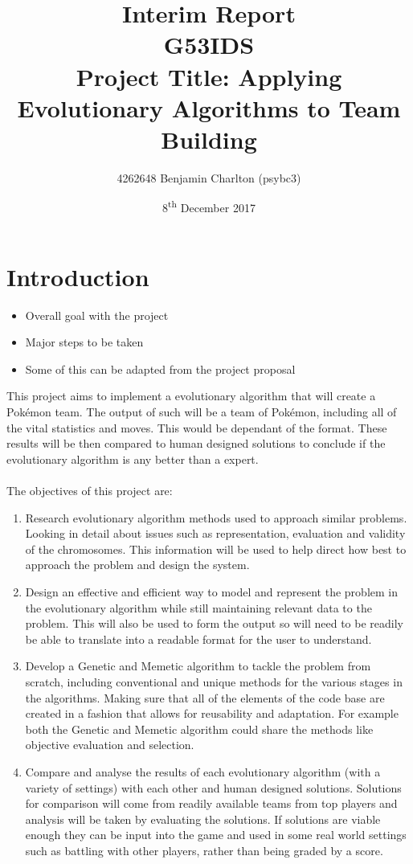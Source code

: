 \documentclass[a4paper]{article}
\title{
    Interim Report
    \\ \large{G53IDS}
    \\ \large{Project Title: Applying Evolutionary Algorithms to \Pokemon{} Team Building}\vspace{-3ex}}
\author{4262648 Benjamin Charlton (psybc3)}
\date{\vspace{-2ex}8\textsuperscript{th} December 2017}
\newcommand{\Pokemon}{Pok\'{e}mon}
\begin{document}
\maketitle
\pagebreak

\tableofcontents
{}
\pagebreak

\section{Introduction}
\begin{itemize}
    \item Overall goal with the project
    \item Major steps to be taken
    \item Some of this can be adapted from the project proposal
\end{itemize}

This project aims to implement a evolutionary algorithm that will create a \Pokemon{} team.
The output of such will be a team of \Pokemon{}, including all of the vital statistics and moves.
This would be dependant of the format. These results will be then compared to human designed solutions to conclude if the evolutionary algorithm is any better than a expert.\\
\\The objectives of this project are:
\begin{enumerate}
    \item Research evolutionary algorithm methods used to approach similar problems.
    Looking in detail about issues such as representation, evaluation and validity of the chromosomes.
    This information will be used to help direct how best to approach the problem and design the system.
    \item Design an effective and efficient way to model and represent the problem in the evolutionary algorithm while still maintaining relevant data to the problem.
    This will also be used to form the output so will need to be readily be able to translate into a readable format for the user to understand.
    \item Develop a Genetic and Memetic algorithm to tackle the problem from scratch, including conventional and unique methods for the various stages in the algorithms.
    Making sure that all of the elements of the code base are created in a fashion that allows for reusability and adaptation.
    For example both the Genetic and Memetic algorithm could share the methods like objective evaluation and selection.
    \item Compare and analyse the results of each evolutionary algorithm (with a variety of settings) with each other and human designed solutions.
    Solutions for comparison will come from readily available teams from top players and analysis will be taken by evaluating the solutions.
    If solutions are viable enough they can be input into the game and used in some real world settings such as battling with other players, rather than being graded by a score.
\end{enumerate}
\end{document}

